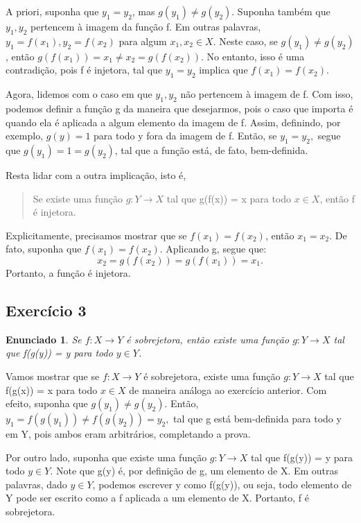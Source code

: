 \documentclass{article}
\newtheorem*{exercise*}{Enunciado}
\begin{document}
    A priori, suponha que $y_1 = y_2$, mas $g(y_1) \neq g(y_2)$. Suponha tamb\'em que $y_1, y_2$ 
    pertencem \`a imagem da fun\c c\~ao f. Em outras palavras, $y_1 = f(x_1), y_2 = f(x_2)$ para 
    algum $x_1, x_2\in{X}$. Neste caso, se $g(y_1) \neq g(y_2)$, ent\~ao $g(f(x_1)) = x_1 \neq 
    x_2 = g(f(x_2))$. No entanto, isso \'e uma contradi\c c\~ao, pois f \'e injetora, tal que
    $y_1 = y_2$ implica que $f(x_1) = f(x_2)$. 
    
    Agora, lidemos com o caso em que $y_1, y_2$ n\~ao pertencem \`a imagem de f. Com isso, podemos
    definir a fun\c c\~ao g da maneira que desejarmos, pois o caso que importa \'e quando ela \'e
    aplicada a algum elemento da imagem de f. Assim, definindo, por exemplo, $g(y) = 1$ para todo
    y fora da imagem de f. Ent\~ao, se $y_1 = y_2,$ segue que $g(y_1) = 1 = g(y_2)$, tal que a fun\c c\~ao
    est\'a, de fato, bem-definida.

    Resta lidar com a outra implica\c c\~ao, isto \'e,
    \begin{quote}
        Se existe uma fun\c c\~ao $g:Y\rightarrow{X}$ tal que g(f(x)) = x para todo $x\in{X}$, 
        ent\~ao f \'e injetora.
    \end{quote}
    Explicitamente, precisamos mostrar que se $f(x_1) = f(x_2)$, ent\~ao $x_1 = x_2$. De fato,
    suponha que $f(x_1) = f(x_2)$. Aplicando g, segue que:
    $$
        x_2 = g(f(x_2)) = g(f(x_1)) = x_1.
    $$
    Portanto, a fun\c c\~ao \'e injetora.
    \qedsymbol
    \newpage
    
    \subsection{Exerc\'icio 3}
    \begin{exercise*}
        Se $f:X\rightarrow{Y}$ \'e sobrejetora, ent\~ao
        existe uma fun\c c\~ao $g:Y\rightarrow{X}$ tal que f(g(y)) = y para todo $y\in{Y}$.            
    \end{exercise*}

    Vamos mostrar que se $f:X\rightarrow{Y}$ \'e sobrejetora, existe uma fun\c c\~ao $g:Y\rightarrow{X}$ 
    tal que f(g(x)) = x para todo $x\in{X}$ de maneira an\'aloga ao exerc\'icio anterior. Com efeito,
    suponha que $g(y_1) \neq g(y_2)$. Ent\~ao,$y_1 = f(g(y_1)) \neq f(g(y_2)) = y_2,$ tal que g est\'a
    bem-definida para todo y em Y, pois ambos eram arbitr\'arios, completando a prova.
    
    Por outro lado, suponha que existe uma fun\c c\~ao $g:Y\rightarrow{X}$ tal que f(g(y)) = y para todo $y\in{Y}$.
    Note que g(y) \'e, por defini\c c\~ao de g, um elemento de X. Em outras palavras, dado $y\in{Y}$, 
    podemos escrever y como f(g(y)), ou seja, todo elemento de Y pode ser escrito como a f aplicada a
    um elemento de X. Portanto, f \'e sobrejetora. 
    \qedsymbol
    \newpage
\end{document}
